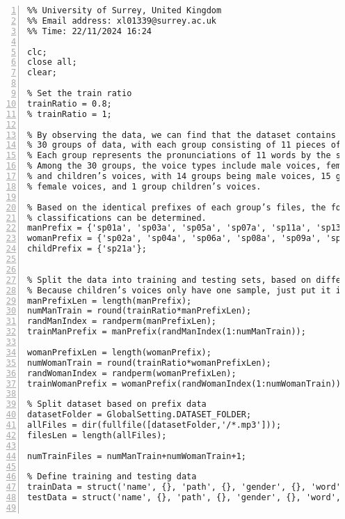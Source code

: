 \documentclass{article}
\begin{document}
\begin{lstlisting}[frame=single, numbers=left, style=Matlab-editor, caption={data\_exploration.m}, label={lst:data_exploration}]
  %% Author: Xiaoguang Liang (PG/T - Comp Sci & Elec Eng)
%% University of Surrey, United Kingdom
%% Email address: xl01339@surrey.ac.uk
%% Time: 22/11/2024 16:24

clc;
close all;
clear;

% Set the train ratio
trainRatio = 0.8;
% trainRatio = 1;

% By observing the data, we can find that the dataset contains a total of
% 30 groups of data, with each group consisting of 11 pieces of data.
% Each group represents the pronunciations of 11 words by the same person.
% Among the 30 groups, the voice types include male voices, female voices,
% and children’s voices, with 14 groups being male voices, 15 groups
% female voices, and 1 group children’s voices.

% Based on the identical prefixes of each group’s files, the following
% classifications can be determined.
manPrefix = {'sp01a', 'sp03a', 'sp05a', 'sp07a', 'sp11a', 'sp13a', 'sp14a', 'sp15a', 'sp17a', 'sp22a', 'sp24a', 'sp26a', 'sp28a', 'sp30a'};
womanPrefix = {'sp02a', 'sp04a', 'sp06a', 'sp08a', 'sp09a', 'sp10a', 'sp12a', 'sp16a', 'sp18a', 'sp19a', 'sp20a', 'sp23a', 'sp25a', 'sp27a', 'sp29a'};
childPrefix = {'sp21a'};


% Split the data into training and testing sets, based on different genders
% Because children’s voices only have one sample, just put it into train data
manPrefixLen = length(manPrefix);
numManTrain = round(trainRatio*manPrefixLen);
randManIndex = randperm(manPrefixLen);
trainManPrefix = manPrefix(randManIndex(1:numManTrain));

womanPrefixLen = length(womanPrefix);
numWomanTrain = round(trainRatio*womanPrefixLen);
randWomanIndex = randperm(womanPrefixLen);
trainWomanPrefix = womanPrefix(randWomanIndex(1:numWomanTrain));

% Split dataset based on prefix data
datasetFolder = GlobalSetting.DATASET_FOLDER;
allFiles = dir(fullfile([datasetFolder,'/*.mp3']));
filesLen = length(allFiles);

numTrainFiles = numManTrain+numWomanTrain+1;

% Define training and testing data
trainData = struct('name', {}, 'path', {}, 'gender', {}, 'word', {}, 'sampleData', {}, 'sampleRate', {}');
testData = struct('name', {}, 'path', {}, 'gender', {}, 'word', {}, 'sampleData', {}, 'sampleRate', {}');


\end{lstlisting}
\end{document}
